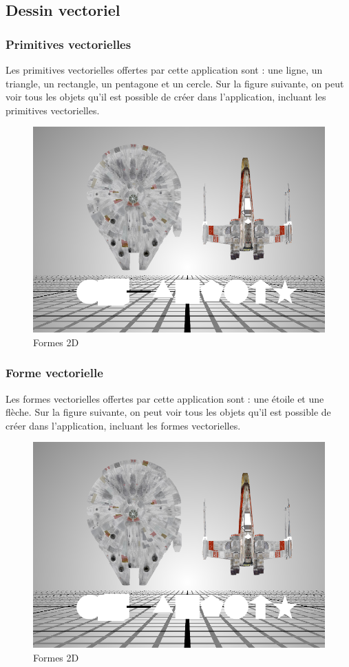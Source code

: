 \subsection{Dessin vectoriel}
\subsubsection{Primitives vectorielles}
Les primitives vectorielles offertes par cette application sont : une ligne, un triangle, un rectangle, un pentagone et un cercle.
Sur la figure suivante, on peut voir tous les objets qu'il est possible de créer dans l'application, incluant les primitives vectorielles.
\begin{figure}[H]
    \centering
	\includegraphics[scale=0.8]{fig/shapes.PNG}
	\caption{Formes 2D}
	\label{fig:primitives2D}
\end{figure}

\subsubsection{Forme vectorielle}
Les formes vectorielles offertes par cette application sont : une étoile et une flèche.
Sur la figure suivante, on peut voir tous les objets qu'il est possible de créer dans l'application, incluant les formes vectorielles.
\begin{figure}[H]
    \centering
	\includegraphics[scale=0.8]{fig/shapes.PNG}
	\caption{Formes 2D}
	\label{fig:formes2D}
\end{figure}

